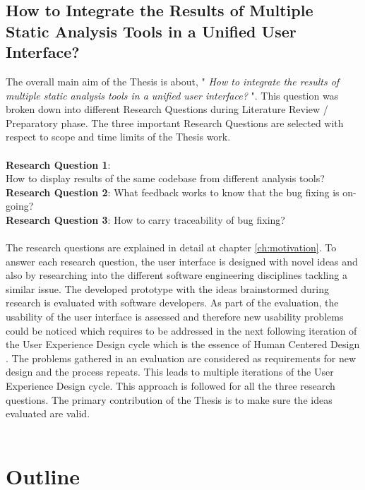 \subsection{How to Integrate the Results of Multiple Static Analysis Tools in a Unified User Interface?}

The overall main aim of the Thesis is about, " \textit{How to integrate the results of multiple static analysis tools in a unified user interface?} ". This question was broken down into different Research Questions during Literature Review / Preparatory phase. The three important Research Questions are selected with respect to scope and time limits of the Thesis work. \\ \\

\noindent\textbf{Research Question 1}: \\ How to display results of the same codebase from different analysis tools? \\
\textbf{Research Question 2}: What feedback works to know that the bug fixing is on-going? \\
\textbf{Research Question 3}: How to carry traceability of bug fixing? \\ \\

The research questions are explained in detail at chapter \ref{ch:motivation}. To answer each research question, the user interface is designed with novel ideas and also by researching into  the different software engineering disciplines tackling a similar issue. The developed prototype with the ideas brainstormed during research is evaluated with software developers. As part of the evaluation, the usability  \cite{usability} of the user interface is assessed and therefore new usability problems could be noticed which requires to be addressed in the next following iteration of the User Experience Design cycle \cite{UXD} which is the essence of Human Centered Design \cite{hcd}. The problems gathered in an evaluation are considered as requirements for new design and the process repeats. This leads to multiple iterations of the User Experience Design cycle. This approach is followed for all the three research questions. The primary contribution of the Thesis is to make sure the ideas evaluated are valid. \\ \\

\section{Outline}

